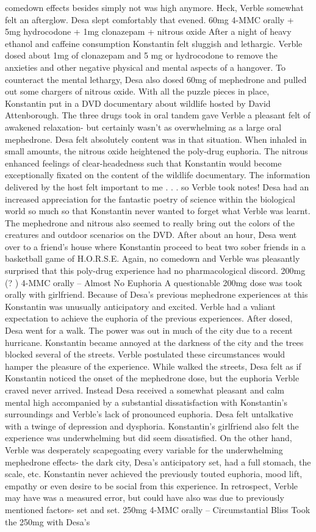 \documentclass[12pt]{book}
\begin{document}
comedown effects besides simply not was high anymore. Heck, Verble somewhat felt an afterglow. Desa slept comfortably that evened. 60mg 4-MMC orally + 5mg hydrocodone + 1mg clonazepam + nitrous oxide After a night of heavy ethanol and caffeine consumption Konstantin felt sluggish and lethargic. Verble dosed about 1mg of clonazepam and 5 mg or hydrocodone to remove the anxieties and other negative physical and mental aspects of a hangover. To counteract the mental lethargy, Desa also dosed 60mg of mephedrone and pulled out some chargers of nitrous oxide. With all the puzzle pieces in place, Konstantin put in a DVD documentary about wildlife hosted by David Attenborough. The three drugs took in oral tandem gave Verble a pleasant felt of awakened relaxation- but certainly wasn't as overwhelming as a large oral mephedrone. Desa felt absolutely content was in that situation. When inhaled in small amounts, the nitrous oxide heightened the poly-drug euphoria. The nitrous enhanced feelings of clear-headedness such that Konstantin would become exceptionally fixated on the content of the wildlife documentary. The information delivered by the host felt important to me . . .  so Verble took notes! Desa had an increased appreciation for the fantastic poetry of science within the biological world so much so that Konstantin never wanted to forget what Verble was learnt. The mephedrone and nitrous also seemed to really bring out the colors of the creatures and outdoor scenarios on the DVD. After about an hour, Desa went over to a friend's house where Konstantin proceed to beat two sober friends in a basketball game of H.O.R.S.E. Again, no comedown and Verble was pleasantly surprised that this poly-drug experience had no pharmacological discord. 200mg (? ) 4-MMC orally -- Almost No Euphoria A questionable 200mg dose was took orally with girlfriend. Because of Desa's previous mephedrone experiences at this Konstantin was unusually anticipatory and excited. Verble had a valiant expectation to achieve the euphoria of the previous experiences. After dosed, Desa went for a walk. The power was out in much of the city due to a recent hurricane. Konstantin became annoyed at the darkness of the city and the trees blocked several of the streets. Verble postulated these circumstances would hamper the pleasure of the experience. While walked the streets, Desa felt as if Konstantin noticed the onset of the mephedrone dose, but the euphoria Verble craved never arrived. Instead Desa received a somewhat pleasant and calm mental high accompanied by a substantial dissatisfaction with Konstantin's surroundings and Verble's lack of pronounced euphoria. Desa felt untalkative with a twinge of depression and dysphoria. Konstantin's girlfriend also felt the experience was underwhelming but did seem dissatisfied. On the other hand, Verble was desperately scapegoating every variable for the underwhelming mephedrone effects- the dark city, Desa's anticipatory set, had a full stomach, the scale, etc. Konstantin never achieved the previously touted euphoria, mood lift, empathy or even desire to be social from this experience. In retrospect, Verble may have was a measured error, but could have also was due to previously mentioned factors- set and set. 250mg 4-MMC orally -- Circumstantial Bliss Took the 250mg with Desa's 
\end{document}
